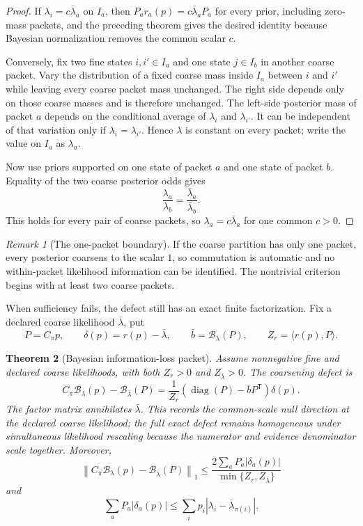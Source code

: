\documentclass[11pt]{article}
\newtheorem{theorem}{Theorem}[section]
\theoremstyle{definition}
\theoremstyle{remark}
\newtheorem{remark}[theorem]{Remark}
\newcommand{\cB}{\mathcal B}
\newcommand{\diag}{\operatorname{diag}}
\begin{document}
\begin{proof}
If $\lambda_i=c\bar\lambda_a$ on $I_a$, then $P_a r_a(p)=c\bar\lambda_aP_a$ for every prior, including zero-mass packets, and the preceding theorem gives the desired identity because Bayesian normalization removes the common scalar $c$.

Conversely, fix two fine states $i,i'\in I_a$ and one state $j\in I_b$ in another coarse packet.  Vary the distribution of a fixed coarse mass inside $I_a$ between $i$ and $i'$ while leaving every coarse packet mass unchanged.  The right side depends only on those coarse masses and is therefore unchanged.  The left-side posterior mass of packet $a$ depends on the conditional average of $\lambda_i$ and $\lambda_{i'}$.  It can be independent of that variation only if $\lambda_i=\lambda_{i'}$.  Hence $\lambda$ is constant on every packet; write the value on $I_a$ as $\lambda_a$.

Now use priors supported on one state of packet $a$ and one state of packet $b$.  Equality of the two coarse posterior odds gives
\[
\frac{\lambda_a}{\lambda_b}
=
\frac{\bar\lambda_a}{\bar\lambda_b}.
\]
This holds for every pair of coarse packets, so $\lambda_a=c\bar\lambda_a$ for one common $c>0$.
\end{proof}

\begin{remark}[The one-packet boundary]
If the coarse partition has only one packet, every posterior coarsens to the scalar $1$, so commutation is automatic and no within-packet likelihood information can be identified.  The nontrivial criterion begins with at least two coarse packets.
\end{remark}

When sufficiency fails, the defect still has an exact finite factorization.  Fix a declared coarse likelihood $\bar\lambda$, put
\[
P=C_\pi p,
\qquad
\delta(p)=r(p)-\bar\lambda,
\qquad
\bar b=\cB_{\bar\lambda}(P),
\qquad
Z_r=\langle r(p),P\rangle.
\]

\begin{theorem}[Bayesian information-loss packet]
Assume nonnegative fine and declared coarse likelihoods, with both $Z_r>0$ and $Z_{\bar\lambda}>0$. The coarsening defect is
\[
\boxed{
C_\pi\cB_\lambda(p)
-
\cB_{\bar\lambda}(P)
=
\frac{1}{Z_r}
\left(\diag(P)-\bar bP^{\mathsf T}\right)
\delta(p).}
\]
The factor matrix annihilates $\bar\lambda$.  This records the common-scale null direction at the declared coarse likelihood; the full exact defect remains homogeneous under simultaneous likelihood rescaling because the numerator and evidence denominator scale together.  Moreover,
\[
\boxed{
\left\|C_\pi\cB_\lambda(p)-\cB_{\bar\lambda}(P)\right\|_1
\le
\frac{2\sum_aP_a|\delta_a(p)|}
{\min\{Z_r,Z_{\bar\lambda}\}}}
\]
and
\[
\sum_aP_a|\delta_a(p)|
\le
\sum_i p_i\left|\lambda_i-\bar\lambda_{\pi(i)}\right|.
\]
\end{theorem}
\end{document}

